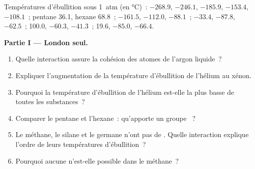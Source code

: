 \begin{problem}
\label{pb:b1:intermolecular-forces-solvents:1}
Températures d'ébullition sous \qty{1}{atm} (en \unit{\celsius})~:
 $-268.9$,
 $-246.1$,  $-185.9$,  $-153.4$,  $-108.1$~;
pentane 36.1, hexane 68.8~;  $-161.5$,  $-112.0$,
 $-88.1$~;  $-33.4$,  $-87.8$,  $-62.5$~;
 100.0,  $-60.3$,  $-41.3$~;  19.6,
 $-85.0$,  $-66.4$.

\medskip
\noindent\textbf{Partie I --- London seul.}
\begin{enumerate}
  \item Quelle interaction assure la cohésion des atomes de l'argon
        liquide~?
  \item Expliquer l'augmentation de la température d'ébullition de
        l'hélium au xénon.
  \item Pourquoi la température d'ébullition de l'hélium est-elle la plus
        basse de toutes les substances~?
  \item Comparer le pentane et l'hexane~: qu'apporte un groupe ~?
  \item Le méthane, le silane et le germane n'ont pas de . Quelle interaction explique l'ordre de leurs
        températures d'ébullition~?
  \item Pourquoi aucune  n'est-elle possible dans le
        méthane~?
\end{enumerate}


\end{problem}
